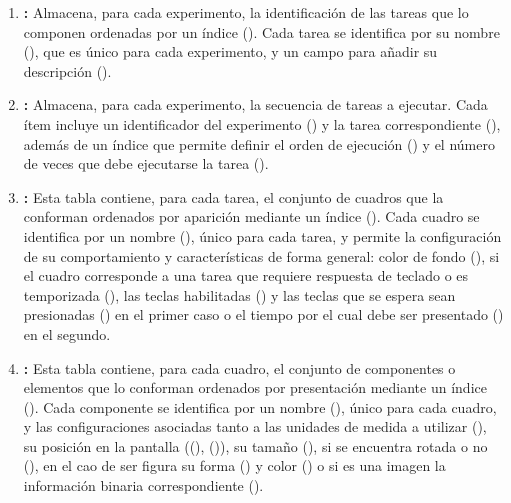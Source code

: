 \documentclass[\main/main.tex]{subfiles}
\begin{document}
\begin{enumerate}
				\item \textbf{:} Almacena, para cada experimento, la identificación de las tareas que lo componen ordenadas por un índice (). Cada tarea se identifica por su nombre (), que es único para cada experimento, y un campo para añadir su descripción ().

				\item \textbf{:} Almacena, para cada experimento, la secuencia de tareas a ejecutar. Cada ítem incluye un identificador del experimento () y la tarea correspondiente (), además de un índice que permite definir el orden de ejecución () y el número de veces que debe ejecutarse la tarea (). 

				\item \textbf{:} Esta tabla contiene, para cada tarea, el conjunto de cuadros que la conforman ordenados por aparición mediante un índice (). Cada cuadro se identifica por un nombre (),  único para cada tarea, y permite la configuración de su comportamiento y características de forma general: color de fondo (), si el cuadro corresponde a una tarea que requiere respuesta de teclado o es temporizada (), las teclas habilitadas () y las teclas que se espera sean presionadas () en el primer caso o el tiempo por el cual debe ser presentado () en el segundo.

				\item \textbf{:} Esta tabla contiene, para cada cuadro, el conjunto de componentes o elementos que lo conforman ordenados por presentación mediante un índice (). Cada componente se identifica por un nombre (), único para cada cuadro, y las configuraciones asociadas tanto a las unidades de medida a utilizar (), su posición en la pantalla ((), ()), su tamaño (), si se encuentra rotada o no (), en el cao de ser figura su forma () y color () o si es una imagen la información binaria correspondiente (). 
			\end{enumerate}
\end{document}
